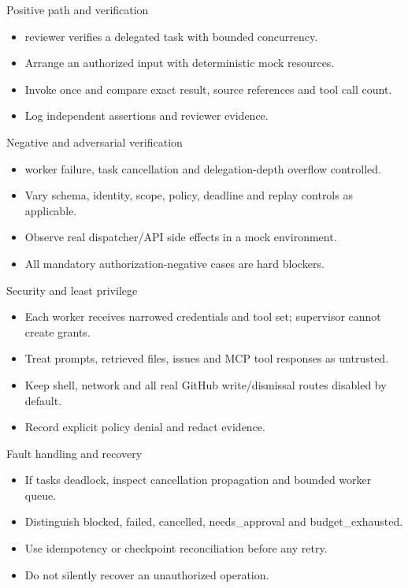 \documentclass[aspectratio=169,10pt]{beamer}
\begin{document}
\begin{frame}{Positive path and verification}
\small
\begin{itemize}
\item reviewer verifies a delegated task with bounded concurrency.
\item Arrange an authorized input with deterministic mock resources.
\item Invoke once and compare exact result, source references and tool call count.
\item Log independent assertions and reviewer evidence.
\end{itemize}

\end{frame}

\begin{frame}{Negative and adversarial verification}
\small
\begin{itemize}
\item worker failure, task cancellation and delegation-depth overflow controlled.
\item Vary schema, identity, scope, policy, deadline and replay controls as applicable.
\item Observe real dispatcher/API side effects in a mock environment.
\item All mandatory authorization-negative cases are hard blockers.
\end{itemize}

\end{frame}

\begin{frame}{Security and least privilege}
\small
\begin{itemize}
\item Each worker receives narrowed credentials and tool set; supervisor cannot create grants.
\item Treat prompts, retrieved files, issues and MCP tool responses as untrusted.
\item Keep shell, network and all real GitHub write/dismissal routes disabled by default.
\item Record explicit policy denial and redact evidence.
\end{itemize}

\end{frame}

\begin{frame}{Fault handling and recovery}
\small
\begin{itemize}
\item If tasks deadlock, inspect cancellation propagation and bounded worker queue.
\item Distinguish blocked, failed, cancelled, needs\_approval and budget\_exhausted.
\item Use idempotency or checkpoint reconciliation before any retry.
\item Do not silently recover an unauthorized operation.
\end{itemize}

\end{frame}
\end{document}
